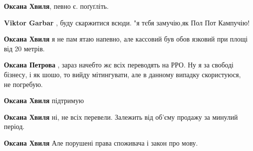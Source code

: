 \begin{itemize}
\begin{itemize}
\textbf{Оксана Хвиля}, певно є. поґуґліть.

 
\textbf{Viktor Garbar} , буду скаржитися всюди. "я тєбя замучію,як Пол Пот Кампучію!

 
\textbf{Оксана Хвиля} я не пам ятаю напевно, але кассовий був обов язковий при площі від 20 метрів.

 
\textbf{Оксана Петрова} , зараз начебто жє всіх переводять на РРО. Ну я за свободі бізнесу, і як шошо, то вийду мітингувати, але в данному випадку скористуюся, не погребую.

 
\textbf{Оксана Хвиля} підтримую

 
\textbf{Оксана Хвиля} ні, не всіх перевели. Залежить від об'єму продажу за минулий період.

 
\textbf{Оксана Хвиля} Але порушені права споживача і закон про мову.


\end{itemize}
\end{itemize}
